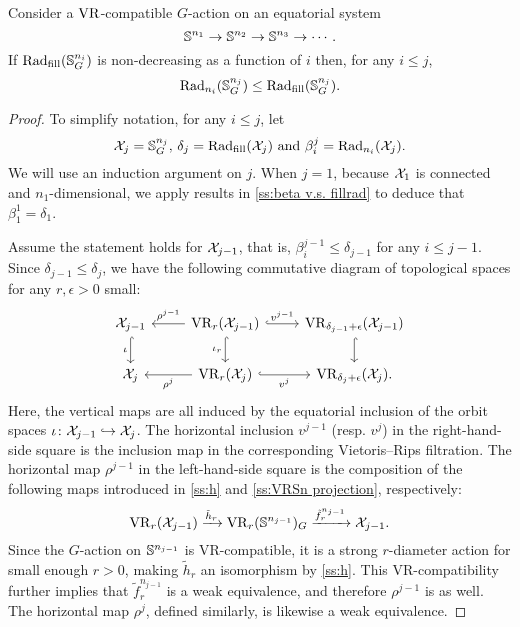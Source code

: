 \subsubsection{}\label{ss:fundamental_lemma}

\lemma Consider a $\mathrm{VR}$-compatible \(G\)-action on an equatorial system
\[
\mathbb{S}^{n_1} \to \mathbb{S}^{n_2} \to \mathbb{S}^{n_3} \to \dotsb .
\]
If $\mathrm{Rad}_{\mathrm{fill}}(\mathbb{S}^{n_i}_G)$ is non-decreasing as a function of \(i\) then, for any \(i \leq j\),
\[
\mathrm{Rad}_{n_i}(\mathbb{S}^{n_j}_G) \leq \mathrm{Rad}_{\mathrm{fill}}(\mathbb{S}^{n_j}_G).
\]

\begin{proof}
    To simplify notation, for any $i \leq j$, let
    \[
        \mathcal{X}_j = \mathbb{S}^{n_j}_G, \,\delta_j = \mathrm{Rad}_{\mathrm{fill}}(\mathcal{X}_j) \text{ and }\beta_i^j = \mathrm{Rad}_{n_i}(\mathcal{X}_j).
    \]
	We will use an induction argument on $j$.
	When $j = 1$, because $\mathcal{X}_1$ is connected and $n_1$-dimensional, we apply results in \cref{ss:beta v.s. fillrad} to deduce that $\beta_1^1 = \delta_1$.

	Assume the statement holds for $\mathcal{X}_{j-1}$, that is, $\beta_i^{j-1} \leq \delta_{j-1}$ for any $i \leq j-1$.
	Since $\delta_{j-1} \leq \delta_j$, we have the following commutative diagram of topological spaces for any $r,\epsilon>0$ small:
    \begin{equation}\label{d:fundamental_bars_diagram}
        \begin{tikzcd}
            \cX_{j-1}
            \ar[d, hook,"{\iota}" left]
            &
            \VR_r(\cX_{j-1})
            \ar[d, hook,"\iota_r" left]
            \ar[l, "\rho^{j-1}" above]
            \ar[r, hook, "v^{j-1}"]
            &
            \VR_{\delta_{j-1}+\epsilon}(\cX_{j-1})
            \ar[d, hook]
            \\
            \cX_j
            &
            \VR_r(\cX_j)
            \ar[l, "\rho^j" below]
            \ar[r, hook, "v^j" below]
            &
            \VR_{\delta_j+\epsilon}(\cX_j).
        \end{tikzcd}
    \end{equation}
    Here, the vertical maps are all induced by the equatorial inclusion of the orbit spaces $\iota \colon \mathcal{X}_{j-1} \hookrightarrow \mathcal{X}_j$.
    The horizontal inclusion $v^{j-1}$ (resp. $v^j$) in the right-hand-side square is the inclusion map in the corresponding Vietoris--Rips filtration.
    The horizontal map $\rho^{j-1}$ in the left-hand-side square is the composition of the following maps introduced in \cref{ss:h} and \cref{ss:VRSn projection}, respectively:
    \[\mathrm{VR}_r(\mathcal{X}_{j-1}) \xrightarrow{\tilde{h}_r}\mathrm{VR}_r(\mathbb{S}^{n_{j-1}})_G \xrightarrow{\tilde{f}_r^{n_{j-1}}} \mathcal{X}_{j-1}.\]
    Since the \( G \)-action on \( \mathbb{S}^{n_{j-1}} \) is VR-compatible, it is a strong \( r \)-diameter action for small enough $r>0$, making \( \tilde{h}_r \) an isomorphism by \cref{ss:h}.
    This VR-compatibility further implies that \( \tilde{f}_r^{n_{j-1}} \) is a weak equivalence, and therefore \( \rho^{j-1} \) is as well.
    The horizontal map \( \rho^j \), defined similarly, is likewise a weak equivalence.


\end{proof}
